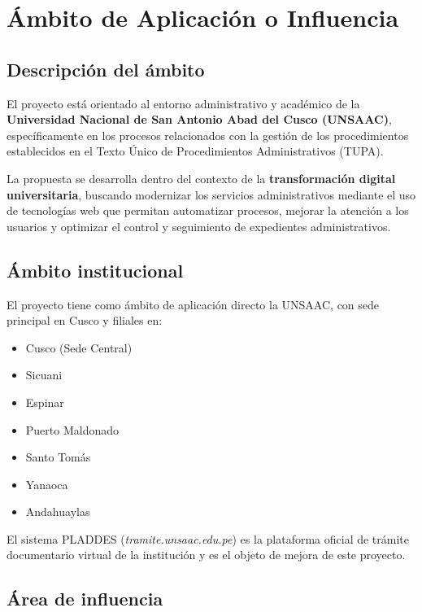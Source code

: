 \section{Ámbito de Aplicación o Influencia}
 
\subsection{Descripción del ámbito}
 
El proyecto está orientado al entorno administrativo y académico de la \textbf{Universidad Nacional de San Antonio Abad del Cusco (UNSAAC)}, específicamente en los procesos relacionados con la gestión de los procedimientos establecidos en el Texto Único de Procedimientos Administrativos (TUPA).
 
La propuesta se desarrolla dentro del contexto de la \textbf{transformación digital universitaria}, buscando modernizar los servicios administrativos mediante el uso de tecnologías web que permitan automatizar procesos, mejorar la atención a los usuarios y optimizar el control y seguimiento de expedientes administrativos.
 
\subsection{Ámbito institucional}
 
El proyecto tiene como ámbito de aplicación directo la UNSAAC, con sede principal en Cusco y filiales en:
 
\begin{itemize}[noitemsep]
    \item Cusco (Sede Central)
    \item Sicuani
    \item Espinar
    \item Puerto Maldonado
    \item Santo Tomás
    \item Yanaoca
    \item Andahuaylas
\end{itemize}
 
El sistema PLADDES (\textit{tramite.unsaac.edu.pe}) es la plataforma oficial de trámite documentario virtual de la institución y es el objeto de mejora de este proyecto.
 
\subsection{Área de influencia}
 
